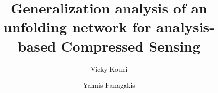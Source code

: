 \documentclass[preprint,12pt]{elsarticle}
\begin{document}
\begin{frontmatter}



\title{Generalization analysis of an unfolding network for analysis-based Compressed Sensing}



\author[1,2]{Vicky Kouni}
\address[1]{Mathematical Institute, University of Oxford}
\address[2]{Isaac Newton Institute for Mathematical Studies, University of Cambridge}

\author[3,4]{Yannis Panagakis}
\address[3]{Department of Informatics \& Telecommunications,\\ National \& Kapodistrian University of Athens}
\address[4]{Archimedes AI, Athena RC}


\end{frontmatter}
\end{document}
